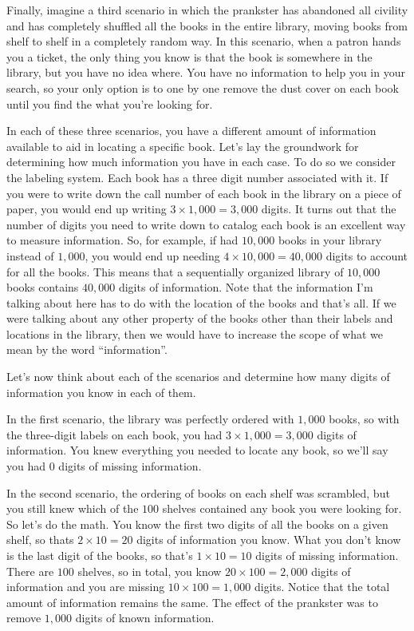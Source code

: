 \documentclass[11pt, oneside]{article}   	%
\begin{document}
Finally, imagine a third scenario in which the prankster has abandoned all
civility and has completely shuffled all the books in the entire library, moving
books from shelf to shelf in a completely random way.  In this scenario, when a
patron hands you a ticket, the only thing you know is that the book is somewhere
in the library, but you have no idea where.  You have no information to help you
in your search, so your only option is to one by one remove the dust cover on
each book until you find the what you're looking for.

In each of these three scenarios, you have a different amount of information
available to aid in locating a specific book.  Let's lay the groundwork for
determining how much information you have in each case.  To do so we consider
the labeling system.  Each book has a three digit number associated with it.  If
you were to write down the call number of each book in the library on a piece of
paper, you would end up writing $3\times1,000=3,000$ digits.  It turns out that
the number of digits you need to write down to catalog each book is an excellent
way to measure information.  So, for example, if had $10,000$ books in your
library instead of $1,000$, you would end up needing $4\times10,000=40,000$
digits to account for all the books. This means that a sequentially organized
library of $10,000$ books contains $40,000$ digits of information.  Note that
the information I'm talking about here has to do with the location of the books
and that's all.  If we were talking about any other property of the books other
than their labels and locations in the library, then we would have to increase
the scope of what we mean by the word ``information''.

Let's now think about each of the scenarios and determine how many digits of
information you know in each of them.

In the first scenario, the library was perfectly ordered with $1,000$ books, so
with the three-digit labels on each book, you had $3\times1,000=3,000$ digits of
information.  You knew everything you needed to locate any book, so we'll say
you had $0$ digits of missing information.

In the second scenario, the ordering of books on each shelf was scrambled, but
you still knew which of the $100$ shelves contained any book you were looking
for.  So let's do the math. You know the first two digits of all the books on a
given shelf, so thats $2\times10=20$ digits of information you know.  What you
don't know is the last digit of the books, so that's $1\times10=10$ digits of
missing information.  There are $100$ shelves, so in total, you know
$20\times100=2,000$ digits of information and you are missing
$10\times100=1,000$ digits.  Notice that the total amount of
information remains the same.  The effect of the prankster was to remove $1,000$
digits of known information.
\end{document}

